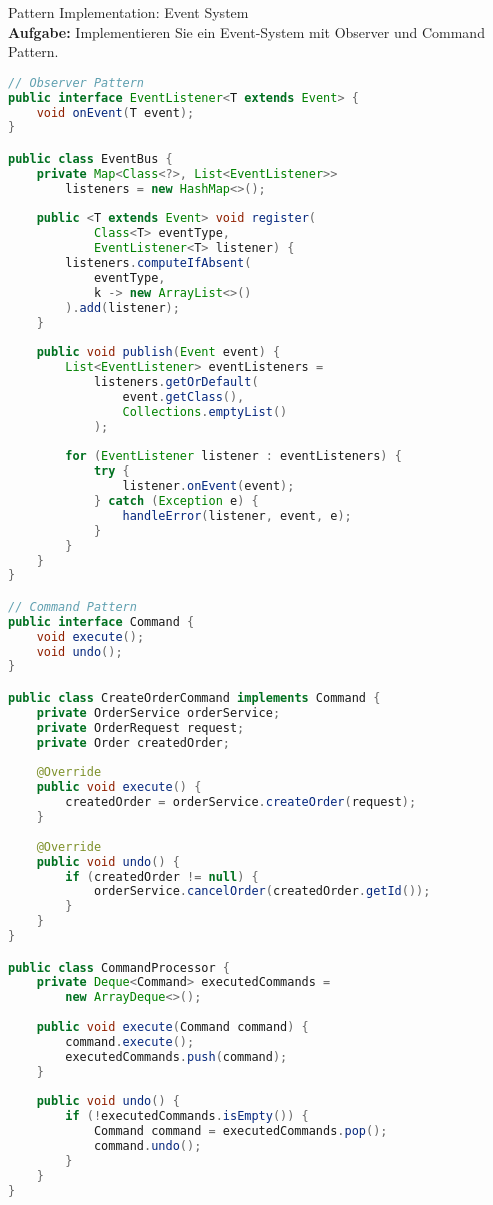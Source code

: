 \begin{example2}[breakable]{Pattern Implementation: Event System}\\
\textbf{Aufgabe:} Implementieren Sie ein Event-System mit Observer und Command Pattern.

\begin{lstlisting}[language=Java, style=basesmol]
// Observer Pattern
public interface EventListener<T extends Event> {
    void onEvent(T event);
}

public class EventBus {
    private Map<Class<?>, List<EventListener>> 
        listeners = new HashMap<>();
    
    public <T extends Event> void register(
            Class<T> eventType, 
            EventListener<T> listener) {
        listeners.computeIfAbsent(
            eventType, 
            k -> new ArrayList<>()
        ).add(listener);
    }
    
    public void publish(Event event) {
        List<EventListener> eventListeners = 
            listeners.getOrDefault(
                event.getClass(), 
                Collections.emptyList()
            );
            
        for (EventListener listener : eventListeners) {
            try {
                listener.onEvent(event);
            } catch (Exception e) {
                handleError(listener, event, e);
            }
        }
    }
}

// Command Pattern
public interface Command {
    void execute();
    void undo();
}

public class CreateOrderCommand implements Command {
    private OrderService orderService;
    private OrderRequest request;
    private Order createdOrder;
    
    @Override
    public void execute() {
        createdOrder = orderService.createOrder(request);
    }
    
    @Override
    public void undo() {
        if (createdOrder != null) {
            orderService.cancelOrder(createdOrder.getId());
        }
    }
}

public class CommandProcessor {
    private Deque<Command> executedCommands = 
        new ArrayDeque<>();
    
    public void execute(Command command) {
        command.execute();
        executedCommands.push(command);
    }
    
    public void undo() {
        if (!executedCommands.isEmpty()) {
            Command command = executedCommands.pop();
            command.undo();
        }
    }
}
\end{lstlisting}


\end{example2}
